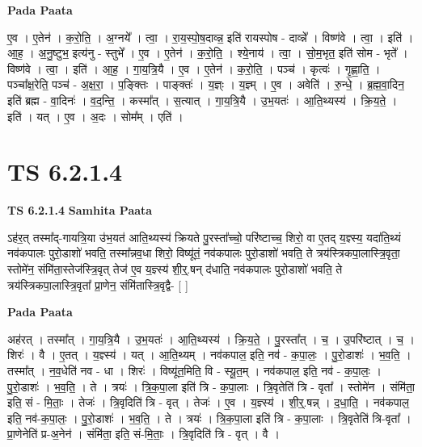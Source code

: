 \documentclass[17pt]{extarticle}
\begin{document}
\textbf{Pada Paata} \newline

ए॒व । ए॒तेन॑ । क॒रो॒ति॒ । अ॒ग्नये᳚ । त्वा॒ । रा॒य॒स्पो॒ष॒दाव्न्न॒ इति॑ रायस्पोष - दाव्न्ने᳚ । विष्ण॑वे । त्वा॒ । इति॑ । आ॒ह॒ । अ॒नु॒ष्टुभ॒ इत्य॑नु - स्तुभे᳚ । ए॒व । ए॒तेन॑ । क॒रो॒ति॒ । श्ये॒नाय॑ । त्वा॒ । सो॒म॒भृत॒ इति॑ सोम - भृते᳚ । विष्ण॑वे । त्वा॒ । इति॑ । आ॒ह॒ । गा॒य॒त्रि॒यै । ए॒व । ए॒तेन॑ । क॒रो॒ति॒ । पञ्च॑ । कृत्वः॑ । गृ॒ह्णा॒ति॒ । पञ्चा᳚क्ष॒रेति॒ पञ्च॑ - अ॒क्ष॒रा॒ । प॒ङ्क्तिः । पाङ्क्तः॑ । य॒ज्ञ्ः । य॒ज्ञ्म् । ए॒व । अवेति॑ । रु॒न्धे॒ । ब्र॒ह्म॒वा॒दिन॒ इति॑ ब्रह्म - वा॒दिनः॑ । व॒द॒न्ति॒ । कस्मा᳚त् । स॒त्यात् । गा॒य॒त्रि॒यै । उ॒भ॒यतः॑ । आ॒ति॒थ्यस्य॑ । क्रि॒य॒ते॒ । इति॑ । यत् । ए॒व । अ॒दः । सोम᳚म् । एति॑ ।  \newline





\section{ TS 6.2.1.4 }

\textbf{TS 6.2.1.4 } \newline
\textbf{Samhita Paata} \newline

ऽह॑र॒त् तस्मा᳚द्-गायत्रि॒या उ॑भ॒यत॑ आति॒थ्यस्य॑ क्रियते पु॒रस्ता᳚च्चो॒ परि॑ष्टाच्च॒ शिरो॒ वा ए॒तद् य॒ज्ञ्स्य॒ यदा॑ति॒थ्यं नव॑कपालः पुरो॒डाशो॑ भवति॒ तस्मा᳚न्नव॒धा शिरो॒ विष्यू॑तं॒ नव॑कपालः पुरो॒डाशो॑ भवति॒ ते त्रय॑स्त्रिकपा॒लास्त्रि॒वृता॒ स्तोमे॑न॒ संमि॑ता॒स्तेज॑स्त्रि॒वृत् तेज॑ ए॒व य॒ज्ञ्स्य॑ शी॒र्॒.षन् द॑धाति॒ नव॑कपालः पुरो॒डाशो॑ भवति॒ ते त्रय॑स्त्रिकपा॒लास्त्रि॒वृता᳚ प्रा॒णेन॒ संमि॑तास्त्रि॒वृद्वै- [  ] \newline

\textbf{Pada Paata} \newline

अह॑रत् । तस्मा᳚त् । गा॒य॒त्रि॒यै । उ॒भ॒यतः॑ । आ॒ति॒थ्यस्य॑ । क्रि॒य॒ते॒ । पु॒रस्ता᳚त् । च॒ । उ॒परि॑ष्टात् । च॒ । शिरः॑ । वै । ए॒तत् । य॒ज्ञ्स्य॑ । यत् । आ॒ति॒थ्यम् । नव॑कपाल॒ इति॒ नव॑ - क॒पा॒लः॒ । पु॒रो॒डाशः॑ । भ॒व॒ति॒ । तस्मा᳚त् । न॒व॒धेति॑ नव - धा । शिरः॑ । विष्यू॑त॒मिति॒ वि - स्यू॒त॒म् । नव॑कपाल॒ इति॒ नव॑ - क॒पा॒लः॒ । पु॒रो॒डाशः॑ । भ॒व॒ति॒ । ते । त्रयः॑ । त्रि॒क॒पा॒ला इति॑ त्रि - क॒पा॒लाः । त्रि॒वृतेति॑ त्रि - वृता᳚ । स्तोमे॑न । संमि॑ता॒ इति॒ सं - मि॒ताः॒ । तेजः॑ । त्रि॒वृदिति॑ त्रि - वृत् । तेजः॑ । ए॒व । य॒ज्ञ्स्य॑ । शी॒र्॒.षन्न् । द॒धा॒ति॒ । नव॑कपाल॒ इति॒ नव॑-क॒पा॒लः॒ । पु॒रो॒डाशः॑ । भ॒व॒ति॒ । ते । त्रयः॑ । त्रि॒क॒पा॒ला इति॑ त्रि - क॒पा॒लाः । त्रि॒वृतेति॑ त्रि-वृता᳚ । प्रा॒णेनेति॑ प्र-अ॒नेन॑ । संमि॑ता॒ इति॒ सं-मि॒ताः॒ । त्रि॒वृदिति॑ त्रि - वृत् । वै ।  \newline
\end{document}
